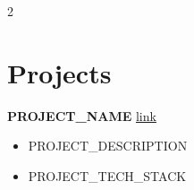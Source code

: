 \documentclass[10pt,a4paper]{article}
\begin{document}
\begin{paracol}{2}
\section{Projects}
\textbf{{{PROJECT_NAME}}} \hfill {\color{gray}\small \href{{{PROJECT_URL}}}{link}}
\begin{itemize}[leftmargin=*,nosep,itemsep=2pt]
  \item {{PROJECT_DESCRIPTION}}
  \item {{PROJECT_TECH_STACK}}
\end{itemize}

\end{paracol}
\end{document}
